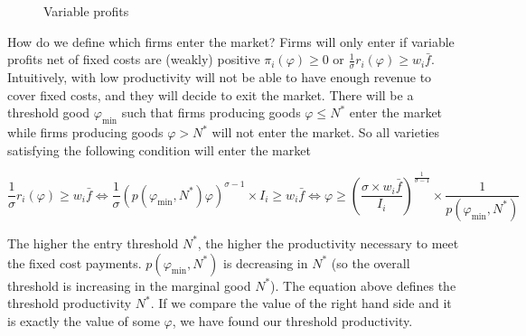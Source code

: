 \documentclass[11pt,letterpaper]{article}
\begin{document}
\begin{figure}
    \caption{Variable profits}
    \label{fig:profits}
\end{figure}
 
How do we define which firms enter the market? Firms will only enter if variable profits net of fixed costs are (weakly) positive $\pi_i(\varphi)\ge 0$ or $\frac{1}{\sigma} r_i(\varphi) \ge w_i\bar{f}$. 
Intuitively, with low productivity will not be able to have enough revenue to cover fixed costs, and they will decide to exit the market. There will be a threshold good $\varphi_{\min}$ such that firms producing goods $\varphi\le N^*$ enter the market while firms producing goods $\varphi>N^*$ will not enter the market. So all varieties satisfying the following condition will enter the market

\begin{equation*}
     \frac{1}{\sigma} r_i(\varphi) \ge w_i\bar{f} \iff  \frac{1}{\sigma} \left( p(\varphi_{\min},N^*)\varphi \right)^{\sigma-1} \times I_i \ge w_i \bar{f} \iff \varphi \ge \left(\frac{\sigma \times w_i \bar{f}}{I_i} \right)^{\frac{1}{\sigma-1}} \times \frac{1}{p(\varphi_{\min},N^*)}
\end{equation*}

The higher the entry threshold $N^*$, the higher the productivity necessary to meet the fixed cost payments. $p(\varphi_{\min},N^*)$ is decreasing in $N^*$ (so the overall threshold is increasing in the marginal good $N^*$). The equation above defines the threshold productivity $N^*$. If we compare the value of the right hand side and it is exactly the value of some $\varphi$, we have found our threshold productivity.
\end{document}
